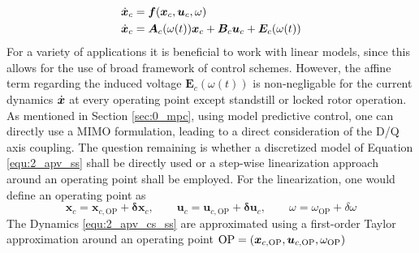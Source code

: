 \begin{equation}
	\begin{split}
		\Dot{{\bm{x}}}_c  &= \bm{f}(\bm{x}_c,\bm{u}_c,\omega )\\
		\Dot{{\bm{x}}}_c &= \bm{A}_c(\omega(t)) {\bm{x}}_c + \bm{B}_c {\bm{u}_c} + \bm{E}_c(\omega(t))
	\end{split}
	\label{equ:2_apv_cs_ss}
\end{equation}
For a variety of applications it is beneficial to work with linear models, since this allows for the use of broad framework of control schemes. However, the affine term regarding the induced voltage $\bm{E}_c(\omega(t))$ is non-negligable for the current dynamics $\Dot{{\bm{x}}}$ at every operating point except standstill or locked rotor operation.\\
As mentioned in Section \ref{sec:0_mpc}, using model predictive control, one can directly use a MIMO formulation, leading to a direct consideration of the D/Q axis coupling. The question remaining is whether a discretized model of Equation \eqref{equ:2_apv_ss} shall be directly used or a step-wise linearization approach around an operating point shall be employed. For the linearization, one would define an operating point as
\begin{equation*}
	\bm{x}_c
	=
	\bm{x}_{c,\mathrm{OP}}
	+
	\bm{\delta x}_c,
	\qquad
	\bm{u}_c
	=
	\bm{u}_{c,\mathrm{OP}}
	+
	\bm{\delta u}_c,
	\qquad
	\omega
	=
	\omega_{\mathrm{OP}}
	+
	\delta\omega 
\end{equation*}
The Dynamics \eqref{equ:2_apv_cs_ss} are approximated using a first-order Taylor approximation around an operating point $\mathrm{OP} = (\bm{x}_{c,\mathrm{OP}},\bm{u}_{c,\mathrm{OP}},\omega_{\mathrm{OP}})$

